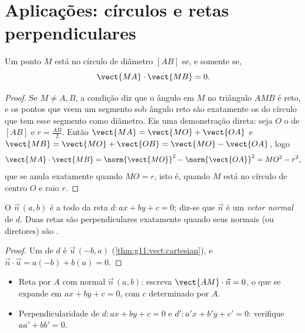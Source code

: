 \section{Aplicações: círculos e retas perpendiculares}

\begin{proposition}\label{prop:g11:scal:diameter}
Um ponto $M$ está no círculo de diâmetro $[AB]$ se, e somente se,
\[
\vect{MA} \cdot \vect{MB} = 0 .
\]
\end{proposition}

\begin{proof}
Se $M \neq A, B$, a condição diz que o ângulo em $M$ no triângulo $AMB$ é
reto, e os pontos que veem um segmento sob ângulo reto são exatamente os
do círculo que tem esse segmento como diâmetro. Eis uma demonstração
direta: seja $O$ o  de $[AB]$ e $r = \frac{AB}{2}$. Então
$\vect{MA} = \vect{MO} + \vect{OA}$ e
$\vect{MB} = \vect{MO} + \vect{OB} = \vect{MO} - \vect{OA}$, logo
\[
\vect{MA}\cdot\vect{MB}
= \norm{\vect{MO}}^2 - \norm{\vect{OA}}^2 = MO^2 - r^2,
\]
que se anula exatamente quando $MO = r$, isto é, quando $M$ está no
círculo de centro $O$ e raio $r$.
\end{proof}

\begin{proposition}\label{prop:g11:scal:normal}
O  $\vec n\,(a, b)$ é  a todo  da reta
$d : ax + by + c = 0$; diz-se que $\vec n$ é um \emph{vetor
normal} de $d$. Duas retas são perpendiculares
exatamente quando seus  normais (ou diretores) são .
\end{proposition}

\begin{proof}
Um  de $d$ é $\vec u\,(-b, a)$
(\cref{thm:g11:vect:cartesian}), e
$\vec n \cdot \vec u = a(-b) + b(a) = 0$.
\end{proof}

\begin{method}\label{met:g11:scal:normal}
\begin{itemize}
  \item Reta por $A$ com normal $\vec n\,(a,b)$: escreva
        $\vect{AM} \cdot \vec n = 0$, o que se expande em
        $ax + by + c = 0$, com $c$ determinado por $A$.
  \item Perpendicularidade de $d: ax+by+c = 0$ e $d': a'x+b'y+c' = 0$:
        verifique $aa' + bb' = 0$.
\end{itemize}
\end{method}

